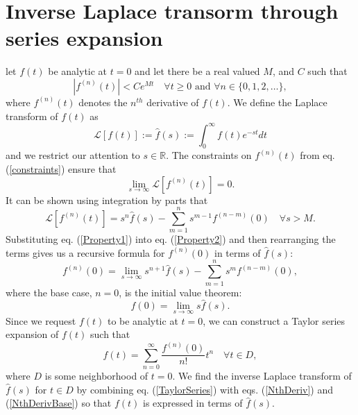\documentclass[extra]{gji}
\begin{document}
\appendix
\section{Inverse Laplace transorm through series expansion}

let $f(t)$ be analytic at $t=0$ and let there
  be a real valued $M$, and $C$ such that
\begin{equation}\label{constraints}
  \left|f^{(n)}(t)\right| < Ce^{Mt}\quad \forall t\geq 0\text{ and }\forall n\in\{0,1,2,\dots\},
\end{equation}
where $f^{(n)}(t)$ denotes the $n^{th}$ derivative of $f(t)$.  We
define the Laplace transform of $f(t)$ as
\begin{equation}
  \mathcal{L}[f(t)] := \hat{f}(s) := \int_{0}^\infty f(t)e^{-st}dt
\end{equation}
and we restrict our attention to $s\in\mathbb{R}$.  The constraints on
$f^{(n)}(t)$ from eq. (\ref{constraints}) ensure that
\begin{equation}\label{Property2}
  \lim_{s \to \infty}\mathcal{L}[f^{(n)}(t)] = 0.
\end{equation}
It can be shown using integration by parts that
\begin{equation}\label{Property1}
  \mathcal{L}[f^{(n)}(t)] = s^n\hat{f}(s) - \sum_{m=1}^ns^{m-1}f^{(n-m)}(0)
  \quad \forall s>M.
\end{equation}
Substituting eq. (\ref{Property1}) into eq. (\ref{Property2}) and then
rearranging the terms gives us a recursive formula for $f^{(n)}(0)$ in
terms of $\hat{f}(s)$:
\begin{equation}\label{NthDeriv}
  f^{(n)}(0) = \lim_{s \to \infty} s^{n + 1}\hat{f}(s) -
               \sum_{m=1}^{n} s^{m}f^{(n-m)}(0),
\end{equation}
where the base case, $n=0$, is the initial value theorem:
\begin{equation}\label{NthDerivBase}
  f(0) = \lim_{s \to \infty} s\hat{f}(s).
\end{equation}
Since we request $f(t)$ to be analytic at $t=0$, we can construct a
Taylor series expansion of $f(t)$ such that
\begin{equation}\label{TaylorSeries}
  f(t) = \sum_{n=0}^\infty\frac{f^{(n)}(0)}{n!}t^n \quad \forall {t\in D},
\end{equation}
where $D$ is some neighborhood of $t=0$. We find the inverse Laplace
transform of $\hat{f}(s)$ for $t\in D$ by combining
eq. (\ref{TaylorSeries}) with eqs. (\ref{NthDeriv}) and (\ref{NthDerivBase}) so that $f(t)$ is
expressed in terms of $\hat{f}(s)$.
\end{document}
